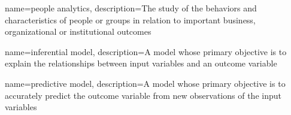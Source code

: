\usepackage{booktabs}
\usepackage{longtable}
\usepackage{graphicx}
\usepackage[bf,singlelinecheck=off]{caption}
\usepackage[scale=.8]{sourcecodepro}

\usepackage{framed,color}

\renewcommand{\textfraction}{0.05}
\renewcommand{\topfraction}{0.8}
\renewcommand{\bottomfraction}{0.8}
\renewcommand{\floatpagefraction}{0.75}

\renewenvironment{quote}{\begin{VF}}{\end{VF}}
\let\oldhref\href
\renewcommand{\href}[2]{#2\footnote{\url{#1}}}

\makeatletter
\newenvironment{kframe}{%
\medskip{}
\setlength{\fboxsep}{.8em}
 \def\at@end@of@kframe{}%
 \ifinner\ifhmode%
  \def\at@end@of@kframe{\end{minipage}}%
  \begin{minipage}{\columnwidth}%
 \fi\fi%
 \def\FrameCommand##1{\hskip\@totalleftmargin \hskip-\fboxsep
 \colorbox{shadecolor}{##1}\hskip-\fboxsep
     \hskip-\linewidth \hskip-\@totalleftmargin \hskip\columnwidth}%
 \MakeFramed {\advance\hsize-\width
   \@totalleftmargin\z@ \linewidth\hsize
   \@setminipage}}%
 {\par\unskip\endMakeFramed%
 \at@end@of@kframe}
\makeatother

\renewenvironment{Shaded}{\begin{kframe}}{\end{kframe}}

\usepackage{makeidx}
\makeindex


\usepackage{amsthm}
\makeatletter
\def\thm@space@setup{%
  \thm@preskip=8pt plus 2pt minus 4pt
  \thm@postskip=\thm@preskip
}
\makeatother

\usepackage[nonumberlist]{glossaries}
\makenoidxglossaries

{
    name={people analytics},
    description={The study of the behaviors and characteristics of people or groups in relation to important business, organizational or institutional outcomes}
}

{
    name={inferential model},
    description={A model whose primary objective is to explain the relationships between input variables and an outcome variable}
}

{
    name={predictive model},
    description={A model whose primary objective is to accurately predict the outcome variable from new observations of the input variables}
}

